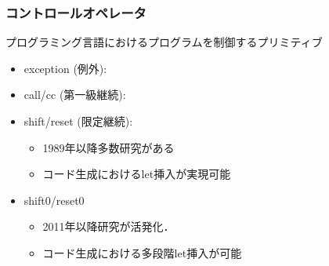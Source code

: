 \documentclass[dvipdfmx,cjk,xcolor=dvipsnames,envcountsect,notheorems,12pt]{beamer}
\theoremstyle{definition}
\begin{document}
\begin{frame}
  \frametitle{コントロールオペレータ}



  \begin{block}{プログラミング言語におけるプログラムを制御するプリミティブ}
    \begin{itemize}
    \item exception (例外): %
    \item call/cc (第一級継続): %
    \item shift/reset (限定継続): %
      \begin{itemize}
      \item 1989年以降多数研究がある
      \item コード生成におけるlet挿入が実現可能
      \end{itemize}
    \item \alert{shift0/reset0}
      \begin{itemize}
        \item 2011年以降研究が活発化．
        \item コード生成における多段階let挿入が可能
      \end{itemize}
    \end{itemize}
  \end{block}
\end{frame}
\end{document}
